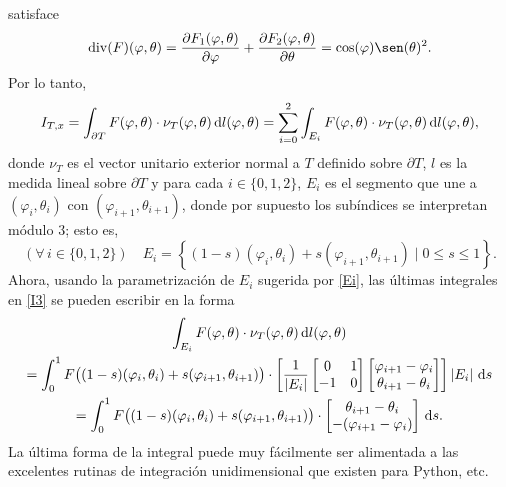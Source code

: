 \documentclass[reqno]{amsart}
\newcommand{\dd}[1][y]{\if#1y\,\fi{\mathrm d}} %
\newcommand{\abs}[2][y]{\if#1y\left\fi\lvert#2\if#1y\right\fi\rvert} %
\begin{document}
%
satisface
%
\begin{equation*}
\operatorname{div}(F)(\varphi,\theta)
= \frac{\partial F_1(\varphi, \theta)}{\partial \varphi} + \frac{\partial F_2(\varphi, \theta)}{\partial \theta}
= \cos(\varphi) \sen(\theta)^2.
\end{equation*}
%
Por lo tanto,
%
\begin{equation}\label{I3}
I_{T,x} = \int_{\partial T} F(\varphi, \theta) \cdot \nu_T(\varphi,\theta) \dd l(\varphi, \theta)
= \sum_{i=0}^2 \int_{E_i} F(\varphi, \theta) \cdot \nu_T(\varphi,\theta) \dd l(\varphi, \theta),
\end{equation}
%
donde $\nu_T$ es el vector unitario exterior normal a $T$ definido sobre $\partial T$, $l$ es la medida lineal sobre $\partial T$ y para cada $i \in \{0, 1, 2\}$, $E_i$ es el segmento que une a $(\varphi_i, \theta_i)$ con $(\varphi_{i+1}, \theta_{i+1})$, donde por supuesto los subíndices se interpretan módulo $3$; esto es,
%
\begin{equation}\label{Ei}
(\forall\,i\in\{0,1,2\}) \quad E_i = \left\{ (1-s) (\varphi_i, \theta_i) + s (\varphi_{i+1}, \theta_{i+1}) \mid 0 \leq s \leq 1 \right\}.
\end{equation}
%
Ahora, usando la parametrización de $E_i$ sugerida por \eqref{Ei}, las últimas integrales en \eqref{I3} se pueden escribir en la forma
%
\begin{multline}\label{lineIntegrals}
\int_{E_i} F(\varphi, \theta) \cdot \nu_T(\varphi,\theta) \dd l(\varphi, \theta)\\
= \int_0^1 F\big( (1-s) (\varphi_i, \theta_i) + s (\varphi_{i+1}, \theta_{i+1}) \big) \cdot \left[ \frac{1}{\abs{E_i}} \begin{bmatrix} 0 & 1\\-1 & 0\end{bmatrix} \begin{bmatrix} \varphi_{i+1}-\varphi_i \\ \theta_{i+1} - \theta_i \end{bmatrix} \right] \abs{E_i} \dd s\\
= \int_0^1 F\big( (1-s) (\varphi_i, \theta_i) + s (\varphi_{i+1}, \theta_{i+1}) \big) \cdot \begin{bmatrix} \theta_{i+1}-\theta_i\\ -(\varphi_{i+1} - \varphi_i) \end{bmatrix} \dd s.
\end{multline}
%
La última forma de la integral puede muy fácilmente ser alimentada a las excelentes rutinas de integración unidimensional que existen para Python, etc.
\end{document}
